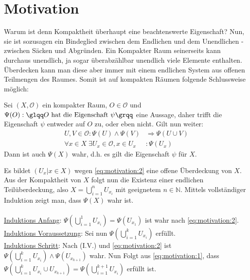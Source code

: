 \section{Motivation}
Warum ist denn Kompaktheit überhaupt eine beachtenswerte Eigenschaft? Nun, sie ist sozusagen ein Bindeglied zwischen dem 
Endlichen und dem Unendlichen - zwischen Säcken und Abgründen. Ein Kompakter Raum seinerseits 
kann durchaus unendlich, ja sogar überabzählbar unendlich viele Elemente enthalten. Überdecken kann man diese aber immer mit
einem endlichen System aus offenen Teilmengen des Raumes. Somit ist auf kompakten Räumen folgende Schlussweise möglich:
\\
\begin{Satz}
	Sei \( (X, \mathcal{O}) \) ein kompakter Raum, \(O \in \mathcal{O}\) und 
	\( \Psi(O) : \mbox{\glqq} O \mbox{ hat die Eigenschaft } \psi \mbox{\grqq} \) eine Aussage, 
	daher trifft die Eigenschaft \(\psi\) entweder auf \(O\) zu, oder eben nicht.
	Gilt nun weiter:
	\begin{align}
		U, V \in \mathcal{O} : \Psi(U) \land \Psi(V) &\Rightarrow \Psi(U \cup V) \label{eq:motivation:1}\\
		\forall x \in X \; \exists U_x \in \mathcal{O}, x \in U_x &: \Psi(U_x) \label{eq:motivation:2}
	\end{align}
	Dann ist auch \(\Psi(X)\) wahr, d.h. es gilt die Eigenschaft \(\psi\) für \(X\).
\end{Satz}
%
	Es bildet \( (U_x | x \in X) \) wegen \eqref{eq:motivation:2} eine offene Überdeckung von \(X\). Aus der Kompaktheit von \(X\) folgt nun 
	die Existenz einer endlichen Teilüberdeckung, also \(X =  \bigcup_{i=1}^{n} U_{x_i}\) mit geeignetem \( n \in \mathbb{N} \). 
	Mittels vollständiger Induktion zeigt man, dass \(\Psi(X)\) wahr ist.
	\\
	\\
	\underline{Induktions Anfang}: \(\Psi(\bigcup_{i=1}^{1} U_{x_i}) = \Psi(U_{x_1}) \) ist wahr nach \eqref{eq:motivation:2}.
	\\
	\underline{Induktions Voraussetzung}: Sei nun \( \Psi(\bigcup_{i=1}^{k} U_{x_i}) \) erfüllt.
	\\
	\underline{Induktions Schritt}: Nach (I.V.) und \eqref{eq:motivation:2} ist \(\Psi(\bigcup_{i=1}^{k} U_{x_i}) \land \Psi(U_{x_{k+1}})\) wahr.
	Nun Folgt aus \eqref{eq:motivation:1}, dass \( \Psi(\bigcup_{i=1}^{k} U_{x_i} \cup U_{x_{k+1}}) = \Psi( \bigcup_{i=1}^{k+1} U_{x_i} ) \) erfüllt ist.
	\\
	\\

